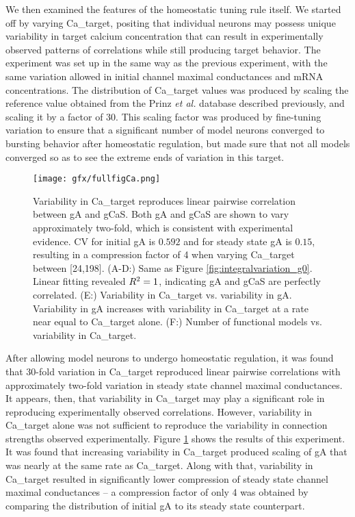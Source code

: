 We then examined the features of the homeostatic tuning rule itself. We started off by varying \ac{Ca_target}, positing that individual neurons may possess unique variability in target calcium concentration that can result in experimentally observed patterns of correlations while still producing target behavior. The experiment was set up in the same way as the previous experiment, with the same variation allowed in initial channel maximal conductances and mRNA concentrations. The distribution of \ac{Ca_target} values was produced by scaling the reference value obtained from the Prinz \textit{et al.} database described previously, and scaling it by a factor of 30. This scaling factor was produced by fine-tuning variation to ensure that a significant number of model neurons converged to bursting behavior after homeostatic regulation, but made sure that not all models converged so as to see the extreme ends of variation in this target.

\begin{figure}[H]
    \centering
    \begin{addmargin}[-2cm]{-3cm}
    \texttt{[image: gfx/fullfigCa.png]}
    \end{addmargin}
\caption[Variability in \acs{Ca_target} under integral control.]{Variability in \ac{Ca_target} reproduces linear pairwise correlation between \ac{gA} and \ac{gCaS}. Both \ac{gA} and \ac{gCaS} are shown to vary approximately two-fold, which is consistent with experimental evidence.\cite{golowasch_activity-dependent_1999} CV for initial \ac{gA} is $0.592$ and for steady state \ac{gA} is $0.15$, resulting in a compression factor of 4 when varying \ac{Ca_target} between [24,198]. (\textsc{A-D:}) Same as Figure \ref{fig:integralvariation_g0}. Linear fitting revealed \(R\textsuperscript{2} = 1\), indicating \ac{gA} and \ac{gCaS} are perfectly correlated. (\textsc{E:}) Variability in \ac{Ca_target} vs. variability in \ac{gA}. Variability in \ac{gA} increases with variability in \ac{Ca_target} at a rate near equal to \ac{Ca_target} alone. (\textsc{F:}) Number of functional models vs. variability in \ac{Ca_target}.}
    \label{fig:integralvariation_Ca}
\end{figure}

After allowing model neurons to undergo homeostatic regulation, it was found that 30-fold variation in \ac{Ca_target} reproduced linear pairwise correlations with approximately two-fold variation in steady state channel maximal conductances. It appears, then, that variability in \ac{Ca_target} may play a significant role in reproducing experimentally observed correlations. However, variability in \ac{Ca_target} alone was not sufficient to reproduce the variability in connection strengths observed experimentally\cite{santin_membrane_2019}. Figure \ref{fig:integralvariation_Ca} shows the results of this experiment. It was found that increasing variability in \ac{Ca_target} produced scaling of \ac{gA} that was nearly at the same rate as \ac{Ca_target}. Along with that, variability in \ac{Ca_target} resulted in significantly lower compression of steady state channel maximal conductances -- a compression factor of only 4 was obtained by comparing the distribution of initial \ac{gA} to its steady state counterpart.

